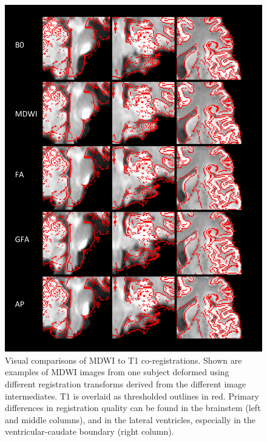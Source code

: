 \begin{figure}[H]
\includegraphics[width=\linewidth]{figure4}
\caption{Visual comparisons of MDWI to T1 co-registrations. 
Shown are examples of MDWI images from one subject deformed using different registration transforms derived from the different image intermediates. 
T1 is overlaid as thresholded outlines in red. 
Primary differences in registration quality can be found in the brainstem (left and middle columns), and in the lateral ventricles, especially in the ventricular-caudate boundary (right column). }
\centering
\label{fig:APfigure4}
\end{figure}

